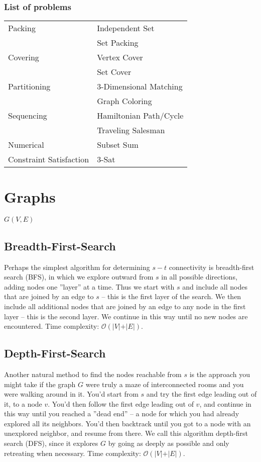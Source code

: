 \documentclass[a4paper,landscape]{article}
\theoremstyle{definition}
\begin{document}
\begin{multicols*}{3}
\subsubsection{List of problems}
\begin{tabular}{l l}
Packing                 & Independent Set \\
                        & Set Packing \\
Covering                & Vertex Cover \\
                        & Set Cover \\
Partitioning            & 3-Dimensional Matching \\
                        & Graph Coloring \\
Sequencing              & Hamiltonian Path/Cycle \\
                        & Traveling Salesman \\
Numerical               & Subset Sum \\
Constraint Satisfaction & 3-Sat \\
\end{tabular}


\section{Graphs}
$G(V, E)$

\subsection{Breadth-First-Search}
Perhaps the simplest algorithm for determining $s-t$ connectivity is
breadth-first search (BFS), in which we explore outward from $s$ in all
possible directions, adding nodes one ''layer'' at a time. Thus we start with
$s$ and include all nodes that are joined by an edge to $s$ -- this is the first
layer of the search. We then include all additional nodes that are joined
by an edge to any node in the first layer -- this is the second layer. We
continue in this way until no new nodes are encountered. 
Time complexity: $\mathcal{O}(\vert{V}\vert + \vert{E}\vert)$.

\subsection{Depth-First-Search}
Another natural method to find the nodes reachable from $s$ is the approach
you might take if the graph $G$ were truly a maze of interconnected rooms
and you were walking around in it. You'd start from $s$ and try the first
edge leading out of it, to a node $v$. You'd then follow the first edge
leading out of $v$, and continue in this way until you reached a ''dead
end'' -- a node for which you had already explored all its neighbors. You'd
then backtrack until you got to a node with an unexplored neighbor, and
resume from there. We call this algorithm depth-first search (DFS), since
it explores $G$ by going as deeply as possible and only retreating when
necessary. Time complexity: $\mathcal{O}(\vert{V}\vert + \vert{E}\vert)$.


\end{multicols*}
\end{document}
